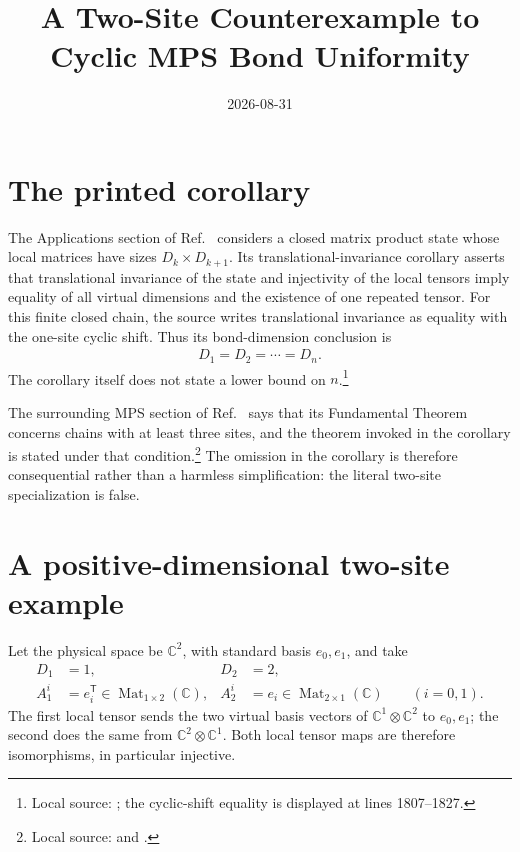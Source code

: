 \documentclass{article}
\title{A Two-Site Counterexample to Cyclic MPS Bond Uniformity}
\author{}
\date{2026-08-31}
\begin{document}
\maketitle
{}

\section{The printed corollary}

The Applications section of Ref.~\cite{Molnar2018NormalPEPS} considers a
closed matrix product state whose local matrices have sizes
$D_k\times D_{k+1}$.  Its translational-invariance corollary asserts that
translational invariance of the state and injectivity of the local tensors
imply equality of all virtual dimensions and the existence of one repeated
tensor.  For this finite closed chain, the source writes translational
invariance as equality with the one-site cyclic shift.
Thus its bond-dimension conclusion is
\begin{align}
    D_1=D_2=\cdots=D_n.
    \label{eq:peps_cyclic_mps_two_site_bond_uniformity_printed_conclusion}
\end{align}
The corollary itself does not state a lower bound on $n$.\footnote{Local source:
; the cyclic-shift equality
is displayed at lines 1807--1827.}

The surrounding MPS section of Ref.~\cite{Molnar2018NormalPEPS} says that its
Fundamental Theorem concerns chains with at least three sites, and the theorem
invoked in the corollary is stated under that condition.\footnote{Local source:
 and
.}  The omission in the
corollary is therefore consequential rather than a harmless simplification:
the literal two-site specialization is false.

\section{A positive-dimensional two-site example}

Let the physical space be $\mathbb C^2$, with standard basis $e_0,e_1$, and
take
\begin{align}
    D_1&=1,
    &D_2&=2,
    \label{eq:peps_cyclic_mps_two_site_bond_uniformity_dimensions}\\
    A_1^i&=e_i^{\mathsf T}\in\operatorname{Mat}_{1\times2}(\mathbb C),
    &A_2^i&=e_i\in\operatorname{Mat}_{2\times1}(\mathbb C)
    \qquad (i=0,1).
    \label{eq:peps_cyclic_mps_two_site_bond_uniformity_tensors}
\end{align}
The first local tensor sends the two virtual basis vectors of
$\mathbb C^1\otimes\mathbb C^2$ to $e_0,e_1$; the second does the same from
$\mathbb C^2\otimes\mathbb C^1$.  Both local tensor maps are therefore
isomorphisms, in particular injective.
\end{document}
